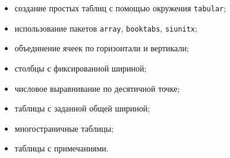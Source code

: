 \documentclass[a4paper,12pt]{article}
\begin{document}
\begin{itemize}
  \item создание простых таблиц с помощью окружения \texttt{tabular};
  \item использование пакетов \texttt{array}, \texttt{booktabs}, \texttt{siunitx};
  \item объединение ячеек по горизонтали и вертикали;
  \item столбцы с фиксированной шириной;
  \item числовое выравнивание по десятичной точке;
  \item таблицы с заданной общей шириной;
  \item многостраничные таблицы;
  \item таблицы с примечаниями.
\end{itemize}
\end{document}
